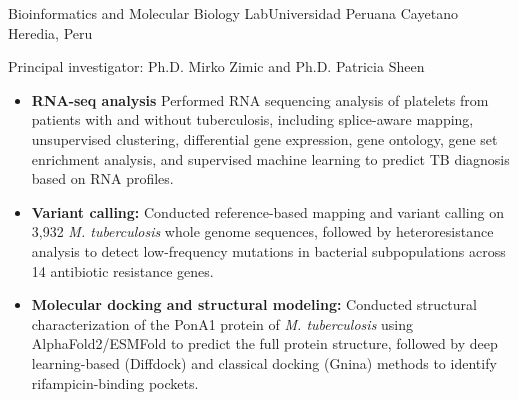 \documentclass[11pt,a4paper,sans]{moderncv}
\begin{document}
  {Bioinformatics and Molecular Biology Lab}{Universidad Peruana Cayetano Heredia, Peru}
  {}
  {Principal investigator: Ph.D. Mirko Zimic and  Ph.D. Patricia Sheen%
  \begin{itemize}%
    \item \textbf{RNA-seq analysis} Performed RNA sequencing analysis of platelets from patients with and without tuberculosis, including splice-aware mapping, unsupervised clustering, differential gene expression, gene ontology, gene set enrichment analysis, and supervised machine learning to predict TB diagnosis based on RNA profiles.
    \item \textbf{Variant calling:} Conducted reference-based mapping and variant calling on 3,932 \textit{M. tuberculosis} whole genome sequences, followed by heteroresistance analysis to detect low-frequency mutations in bacterial subpopulations across 14 antibiotic resistance genes.
    \item \textbf{Molecular docking and structural modeling:} Conducted structural characterization of the PonA1 protein of \textit{M. tuberculosis} using AlphaFold2/ESMFold to predict the full protein structure, followed by deep learning-based (Diffdock) and classical docking (Gnina) methods to identify rifampicin-binding pockets.
  \end{itemize}
  }
\end{document}
